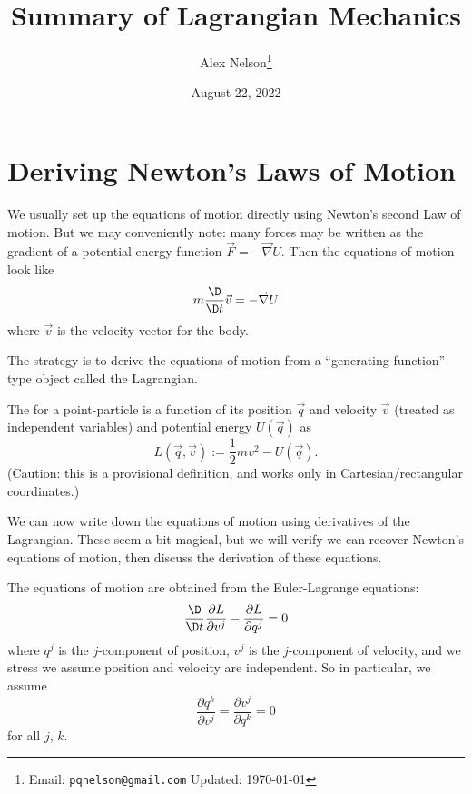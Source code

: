 \title{Summary of Lagrangian Mechanics}
\author{Alex Nelson\footnote{Email: \texttt{pqnelson@gmail.com}\qquad
  Updated: \today}}
\date{August 22, 2022}
\maketitle

\section{Deriving Newton's Laws of Motion}
\M
We usually set up the equations of motion directly using Newton's second
Law of motion. But we may conveniently note: many forces may be written
as the gradient of a potential energy function $\vec{F}=-\vec{\nabla}U$.
Then the equations of motion look like
\begin{equation}
m\frac{\D}{\D t}\vec{v} = -\vec{\nabla}U
\end{equation}
where $\vec{v}$ is the velocity vector for the body.

The strategy is to derive the equations of motion from a ``generating
function''-type object called the Lagrangian.

\begin{definition}
The  for a point-particle is a function of its
position $\vec{q}$ and velocity $\vec{v}$ (treated as independent
variables) and potential energy $U(\vec{q})$ as
\begin{equation}
L(\vec{q},\vec{v}) := \frac{1}{2}mv^{2} - U(\vec{q}).
\end{equation}
(Caution: this is a provisional definition, and works only in
Cartesian/rectangular coordinates.)
\end{definition}

We can now write down the equations of motion using derivatives of the
Lagrangian. These seem a bit magical, but we will verify we can recover
Newton's equations of motion, then discuss the derivation of these
equations.

The equations of motion are obtained from the Euler-Lagrange equations:
\begin{equation}
\frac{\D}{\D t}\frac{\partial L}{\partial v^{j}} - \frac{\partial L}{\partial q^{j}} = 0
\end{equation}
where $q^{j}$ is the $j$-component of position, $v^{j}$ is the
$j$-component of velocity, and we stress we assume position and velocity
are independent. So in particular, we assume
\begin{equation}
\frac{\partial q^{k}}{\partial v^{j}} = \frac{\partial v^{j}}{\partial q^{k}} = 0
\end{equation}
for all $j$, $k$.

